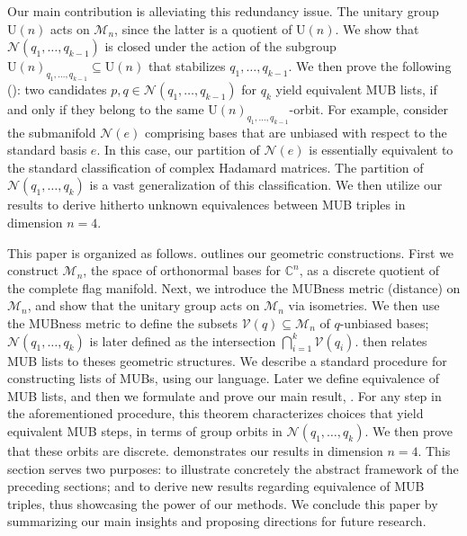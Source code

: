\documentclass[referee,sn-mathphys-num]{sn-jnl}%
\theoremstyle{thmstyleone}%
\theoremstyle{thmstyletwo}%
\theoremstyle{remark}
\theoremstyle{thmstylethree}%
\begin{document}
Our main contribution is alleviating this redundancy issue. The unitary group $ \mathrm{U} \left( n \right) $ acts on $ \mathcal{M}_n $, since the latter is a quotient of $ \mathrm{U} \left( n \right) $. We show that $ \mathcal{N} \left( q_1, \ldots, q_{k-1} \right) $ is closed under the action of the subgroup $ \mathrm{U} \left( n \right)_{q_1, \ldots, q_{k-1}} \subseteq \mathrm{U} \left( n \right) $ that stabilizes $ q_1, \ldots, q_{k-1} $. We then prove the following (): two candidates $p, q \in \mathcal{N} \left( q_1, \ldots, q_{k-1} \right) $ for $q_k$ yield equivalent MUB lists, if and only if they belong to the same $ \mathrm{U} \left( n \right)_{q_1, \ldots, q_{k-1}} $-orbit.
For example, consider the submanifold $ \mathcal{N} \left( e \right) $ comprising bases that are unbiased with respect to the standard basis $e$. In this case, our partition of $ \mathcal{N} \left( e \right) $ is essentially equivalent to the standard classification of complex Hadamard matrices.
The partition of $ \mathcal{N} \left( q_1, \ldots, q_k \right) $ is a vast generalization of this classification. We then utilize our results to derive hitherto unknown equivalences between MUB triples in dimension $n=4$.

This paper is organized as follows.  outlines our geometric constructions. First we construct $ \mathcal{M}_n $, the space of orthonormal bases for $\mathbb{C}^n$, as a discrete quotient of the complete flag manifold. Next, we introduce the MUBness metric (distance) on $ \mathcal{M}_n $, and show that the unitary group acts on $ \mathcal{M}_n $ via isometries. We then use the MUBness metric to define the subsets $ \mathcal{V} \left( q \right) \subseteq \mathcal{M}_n $ of $q$-unbiased bases; $\mathcal{N} \left( q_1, \ldots, q_k \right)$ is later defined as the intersection $ \bigcap_{i=1}^k \mathcal{V} \left( q_i \right) $.  then relates MUB lists to theses geometric structures. We describe a standard procedure for constructing lists of MUBs, using our language. Later we define equivalence of MUB lists, and then we formulate and prove our main result, . For any step in the aforementioned procedure, this theorem characterizes choices that yield equivalent MUB steps, in terms of group orbits in $ \mathcal{N} \left( q_1, \ldots, q_k \right) $. We then prove that these orbits are discrete.  demonstrates our results in dimension $n=4$. This section serves two purposes: to illustrate concretely the abstract framework of the preceding sections; and to derive new results regarding equivalence of MUB triples, thus showcasing the power of our methods.
We conclude this paper by summarizing our main insights and proposing directions for future research.
\end{document}
